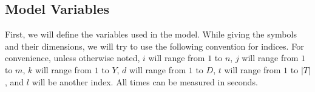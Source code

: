 \documentclass{article}
\begin{document}


\subsection{Model Variables}

First, we will define the variables used in the model.
While giving the symbols and their dimensions, we will try to use the following convention for indices.
For convenience, unless otherwise noted, 
$i$ will range from $1$ to $n$,
$j$ will range from $1$ to $m$,
$k$ will range from $1$ to $Y$,
$d$ will range from $1$ to $D$,
$t$ will range from $1$ to $|T|$,
and $l$ will be another index.
All times can be measured in seconds.
\end{document}
